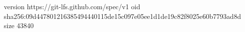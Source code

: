 version https://git-lfs.github.com/spec/v1
oid sha256:09d447801216385494440115de15c097e05ee1d1de19c82f8025e60b7793ad8d
size 43840
